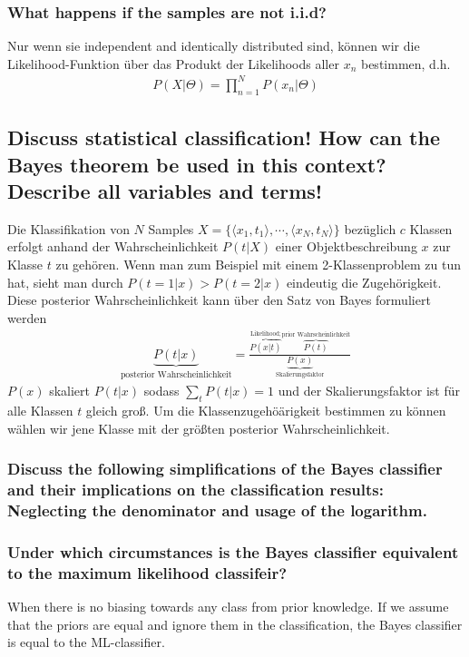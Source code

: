 \documentclass[12pt]{scrartcl}
\begin{document}
\subsubsection{What happens if the samples are not i.i.d?}
\label{iid}Nur wenn sie independent and identically distributed sind, können wir die Likelihood-Funktion über das Produkt der Likelihoods aller $x_n$ bestimmen, d.h.
\begin{align*}
P(X|\Theta) = \prod_{n=1}^N P(x_n|\Theta)
\end{align*}

\subsection{Discuss statistical classification! How can the Bayes theorem be used in this context? Describe all variables and terms!}

Die Klassifikation von $N$ Samples $X=\{\langle x_1,t_1 \rangle, \cdots , \langle x_N,t_N \rangle\}$ bezüglich $c$ Klassen erfolgt anhand der Wahrscheinlichkeit $P(t|X)$ einer Objektbeschreibung $x$ zur Klasse $t$ zu gehören. Wenn man zum Beispiel mit einem 2-Klassenproblem zu tun hat, sieht man durch $P(t=1|x) > P(t=2|x)$ eindeutig die Zugehörigkeit. \\
\label{bayes}Diese posterior Wahrscheinlichkeit kann über den Satz von Bayes formuliert werden
\begin{align*}
\underbrace{P(t|x)}_{\text{posterior Wahrscheinlichkeit}} = \frac{\overbrace{P(x|t)}^{\text{Likelihood;}} \overbrace{P(t)}^{\text{prior Wahrscheinlichkeit}}}{\underbrace{P(x)}_{\text{Skalierungsfaktor}}}
\end{align*}
$P(x)$ skaliert $P(t|x)$ sodass $\sum_t P(t|x) = 1$ und der Skalierungsfaktor ist für alle Klassen $t$ gleich groß. Um die Klassenzugehöärigkeit bestimmen zu können wählen wir jene Klasse mit der größten posterior Wahrscheinlichkeit. \\

\subsubsection{Discuss the following simplifications of the Bayes classifier and their implications on the classification results: Neglecting the denominator and usage of the logarithm.}

\subsubsection{Under which circumstances is the Bayes classifier equivalent to the maximum likelihood classifeir?}
When there is no biasing towards any class from prior knowledge. If we assume that the priors are equal and ignore them in the classification, the Bayes classifier is equal to the ML-classifier.
\end{document}
